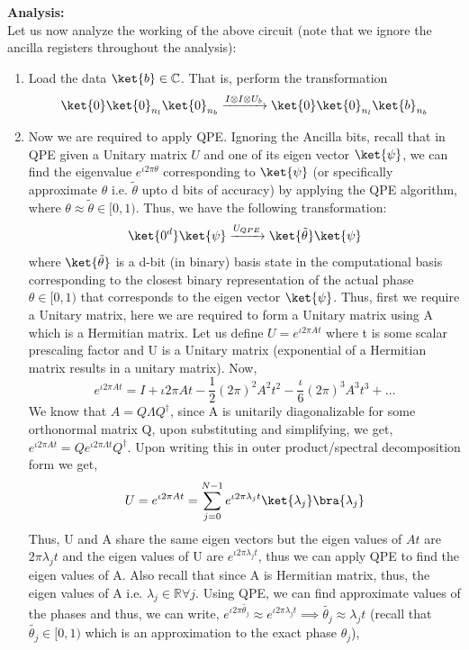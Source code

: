 \documentclass[12pt, oneside]{book}
\theoremstyle{definition}
\theoremstyle{definition}
\theoremstyle{remark}
\begin{document}
\textbf{Analysis:}\\
Let us now analyze the working of the above circuit (note that we ignore the ancilla registers throughout the analysis):
\begin{enumerate}
    \item Load the data $\ket{b} \in \mathbb{C}$. That is, perform the transformation
    \[
        \ket{0}\ket{0}_{n_l}\ket{0}_{n_b} \xrightarrow{I\otimes I\otimes U_b} \ket{0}\ket{0}_{n_l}\ket{b}_{n_b}
    \]
    \item Now we are required to apply QPE. Ignoring the Ancilla bits, recall that in QPE given a Unitary matrix $U$ and one of its eigen vector $\ket{\psi}$,
    we can find the eigenvalue $e^{\iota 2\pi \theta}$ corresponding to $\ket{\psi}$ (or specifically approximate $\theta$ i.e. $\tilde{\theta}$ upto d bits of accuracy) by applying the QPE algorithm,
    where $\theta \approx \tilde{\theta} \in [0,1)$. Thus, we have the following transformation:
    \[
        \ket{0^d}\ket{\psi}\xrightarrow{U_{QPE}} \ket{\tilde{\theta}}\ket{\psi}
    \]
    where $\ket{\tilde{\theta}}$ is a d-bit (in binary) basis state in the computational basis corresponding to the closest binary representation of the actual phase $\theta \in [0,1)$ that corresponds to the eigen vector $\ket{\psi}$.
    Thus, first we require a Unitary matrix, here we are required to form a Unitary matrix using A which is a Hermitian matrix.
    Let us define $U=e^{\iota 2\pi At}$ where t is some scalar prescaling factor and U is a Unitary matrix (exponential of a Hermitian matrix results in a unitary matrix). Now,
    \[
        e^{\iota 2\pi At}=I+\iota 2\pi At-\frac{1}{2}(2\pi)^2A^2t^2-\frac{\iota}{6}(2\pi)^3 A^3t^3+\ldots
    \]
    We know that $A=Q\Lambda Q^{\dagger}$, since A is unitarily diagonalizable for some orthonormal matrix Q, upon substituting and simplifying, we get, $e^{\iota 2\pi At}=Qe^{\iota 2\pi \Lambda t}Q^{\dagger}$.
    Upon writing this in outer product/spectral decomposition form we get,
    \[
        U=e^{\iota 2\pi At}=\sum_{j=0}^{N-1}e^{\iota 2\pi \lambda_j t}\ket{\lambda_j}\bra{\lambda_j}
    \]
    Thus, U and A share the same eigen vectors but the eigen values of $At$ are $2\pi \lambda_jt$ and the eigen values of U are $e^{\iota 2\pi \lambda_j t}$, thus we can apply QPE to find the eigen values of A. Also recall that since A is Hermitian matrix, thus, the eigen values of A i.e. $\lambda_j \in \mathbb{R} \forall j$. Using QPE, we can find approximate values of the phases and thus, we can write,
    $e^{\iota 2\pi \tilde{\theta_j}}\approx e^{\iota 2\pi \lambda_j t} \implies \tilde{\theta_j}\approx \lambda_j t$ (recall that $\tilde{\theta_j}\in [0,1)$ which is an approximation to the exact phase $\theta_j$),

\end{enumerate}
\end{document}
